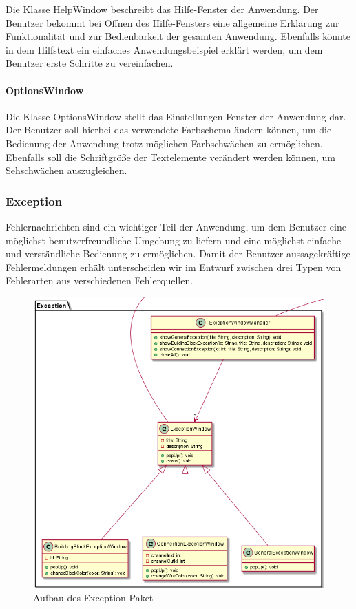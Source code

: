 \documentclass[parskip=full]{scrartcl}
\begin{document}
Die Klasse HelpWindow beschreibt das Hilfe-Fenster der Anwendung. Der Benutzer bekommt bei Öffnen des Hilfe-Fensters eine allgemeine Erklärung zur Funktionalität und zur Bedienbarkeit der gesamten Anwendung. Ebenfalls könnte in dem Hilfstext ein einfaches Anwendungsbeispiel erklärt werden, um dem Benutzer erste Schritte zu vereinfachen.

\paragraph{OptionsWindow}

Die Klasse OptionsWindow stellt das Einstellungen-Fenster der Anwendung dar. Der Benutzer soll hierbei das verwendete Farbschema ändern können, um die Bedienung der Anwendung trotz möglichen Farbschwächen zu ermöglichen. Ebenfalls soll die Schriftgröße der Textelemente verändert werden können, um Sehschwächen auszugleichen. 

\newpage

\subsubsection{Exception}

Fehlernachrichten sind ein wichtiger Teil der Anwendung, um dem Benutzer eine möglichst benutzerfreundliche Umgebung zu liefern und eine möglichst einfache und verständliche Bedienung zu ermöglichen. Damit der Benutzer aussagekräftige Fehlermeldungen erhält unterscheiden wir im Entwurf zwischen drei Typen von Fehlerarten aus verschiedenen Fehlerquellen.

\begin{figure}[htbp]
	\begin{center}
		\includegraphics[width = 14cm]{Grafiken/ExceptionNamespace.png}
		\caption{Aufbau des Exception-Paket}
		\label{Entwurf_Grob}
	\end{center}
\end{figure}
\end{document}
